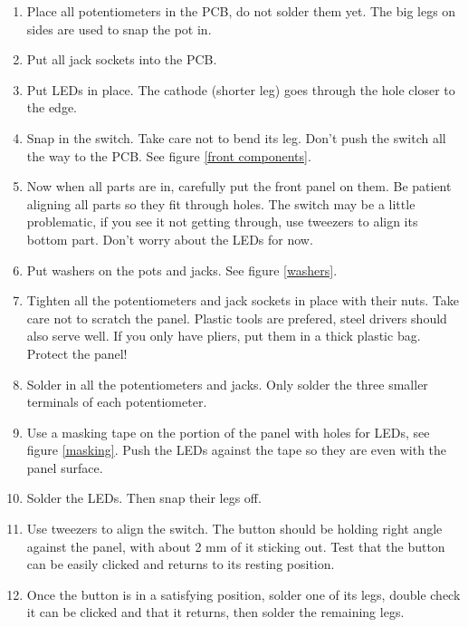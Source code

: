\documentclass[10pt,a4paper,twocolumn]{article}
\begin{document}
\begin{enumerate}
  \item Place all potentiometers in the PCB, do not solder them yet. The big legs on sides are used to snap the pot in.
  \item Put all jack sockets into the PCB.
  \item Put LEDs in place. The cathode (shorter leg) goes through the hole closer to the edge.
  \item Snap in the switch. Take care not to bend its leg. Don't push the switch all the way to the PCB. See figure \ref{front components}.
  \item Now when all parts are in, carefully put the front panel on them. Be patient aligning all parts so they fit through holes. The switch may be a little problematic, if you see it not getting through, use tweezers to align its bottom part. Don't worry about the LEDs for now.
  \item Put washers on the pots and jacks. See figure \ref{washers}.
  \item Tighten all the potentiometers and jack sockets in place with their nuts. Take care not to scratch the panel. Plastic tools are prefered, steel drivers should also serve well. If you only have pliers, put them in a thick plastic bag. Protect the panel!
  \item Solder in all the potentiometers and jacks. Only solder the three smaller terminals of each potentiometer.
  \item Use a masking tape on the portion of the panel with holes for LEDs, see figure \ref{masking}. Push the LEDs against the tape so they are even with the panel surface.
  \item Solder the LEDs. Then snap their legs off.
  \item Use tweezers to align the switch. The button should be holding right angle against the panel, with about 2 mm of it sticking out. Test that the button can be easily clicked and returns to its resting position.
  \item Once the button is in a satisfying position, solder one of its legs, double check it can be clicked and that it returns, then solder the remaining legs.
\end{enumerate}
\end{document}
